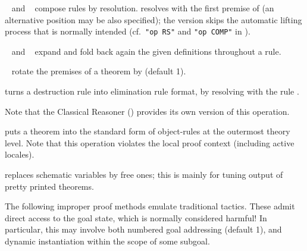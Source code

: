 \begin{isabellebody}
\begin{isamarkuptext}
\begin{descr}
  \item [\hyperlink{attribute.THEN}{\mbox{\isa{THEN}}}~\isa{a} and \hyperlink{attribute.COMP}{\mbox{\isa{COMP}}}~\isa{a}]
  compose rules by resolution.  \hyperlink{attribute.THEN}{\mbox{}} resolves with the
  first premise of  (an alternative position may be also
  specified); the \hyperlink{attribute.COMP}{\mbox{}} version skips the automatic
  lifting process that is normally intended (cf.\ \verb|"op RS"| and
  \verb|"op COMP"| in \cite[\S5]{isabelle-ref}).
  
  \item [\hyperlink{attribute.unfolded}{\mbox{\isa{unfolded}}}~\isa{{\isachardoublequote}a\isactrlsub {\isadigit{1}}\ {\isasymdots}\ a\isactrlsub n{\isachardoublequote}} and
  \hyperlink{attribute.folded}{\mbox{\isa{folded}}}~\isa{{\isachardoublequote}a\isactrlsub {\isadigit{1}}\ {\isasymdots}\ a\isactrlsub n{\isachardoublequote}}] expand and fold
  back again the given definitions throughout a rule.

  \item [\hyperlink{attribute.rotated}{\mbox{\isa{rotated}}}~\isa{n}] rotate the premises of a
  theorem by  (default 1).

  \item [\hyperlink{attribute.Pure.elim_format}{\mbox{\isa{Pure{\isachardot}elim{\isacharunderscore}format}}}] turns a destruction rule into
  elimination rule format, by resolving with the rule .
  
  Note that the Classical Reasoner () provides
  its own version of this operation.

  \item [\hyperlink{attribute.standard}{\mbox{\isa{standard}}}] puts a theorem into the standard form
  of object-rules at the outermost theory level.  Note that this
  operation violates the local proof context (including active
  locales).

  \item [\hyperlink{attribute.no_vars}{\mbox{\isa{no{\isacharunderscore}vars}}}] replaces schematic variables by free
  ones; this is mainly for tuning output of pretty printed theorems.

  \end{descr}%
\end{isamarkuptext}%
\isamarkuptrue%
%
\isamarkuptrue%
%
\begin{isamarkuptext}%
The following improper proof methods emulate traditional tactics.
  These admit direct access to the goal state, which is normally
  considered harmful!  In particular, this may involve both numbered
  goal addressing (default 1), and dynamic instantiation within the
  scope of some subgoal.


\end{isamarkuptext}
\end{isabellebody}
